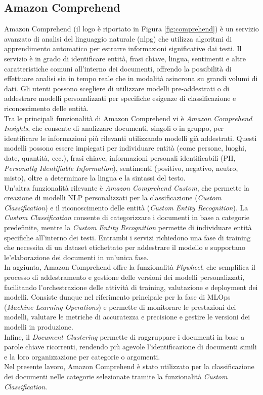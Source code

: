 \subsection{Amazon Comprehend}
Amazon Comprehend (il logo è riportato in Figura \ref{fig:comprehend}) è un servizio avanzato di analisi del linguaggio naturale (\gls{nlpg}) che utilizza algoritmi di apprendimento automatico per estrarre informazioni significative dai testi. Il servizio è in grado di identificare entità, frasi chiave, lingua, sentimenti e altre caratteristiche comuni all'interno dei documenti, offrendo la possibilità di effettuare analisi sia in tempo reale che in modalità asincrona su grandi volumi di dati. Gli utenti possono scegliere di utilizzare modelli pre-addestrati o di addestrare modelli personalizzati per specifiche esigenze di classificazione e riconoscimento delle entità.\\
Tra le principali funzionalità di Amazon Comprehend vi è \textit{Amazon Comprehend Insights}, che consente di analizzare documenti, singoli o in gruppo, per identificare le informazioni più rilevanti utilizzando modelli già addestrati. Questi modelli possono essere impiegati per individuare entità (come persone, luoghi, date, quantità, ecc.), frasi chiave, informazioni personali identificabili (PII, \textit{Personally Identifiable Information}), sentimenti (positivo, negativo, neutro, misto), oltre a determinare la lingua e la sintassi del testo.\\
Un'altra funzionalità rilevante è \textit{Amazon Comprehend Custom}, che permette la creazione di modelli NLP personalizzati per la classificazione (\textit{Custom Classification}) e il riconoscimento delle entità (\textit{Custom Entity Recognition}). La \textit{Custom Classification} consente di categorizzare i documenti in base a categorie predefinite, mentre la \textit{Custom Entity Recognition} permette di individuare entità specifiche all'interno dei testi. Entrambi i servizi richiedono una fase di training che necessita di un dataset etichettato per addestrare il modello e supportano le'elaborazione dei documenti in un'unica fase.\\
In aggiunta, Amazon Comprehend offre la funzionalità \textit{Flywheel}, che semplifica il processo di addestramento e gestione delle versioni dei modelli personalizzati, facilitando l'orchestrazione delle attività di training, valutazione e deployment dei modelli. Consiste dunque nel riferimento principale per la fase di MLOps (\textit{Machine Learning Operations}) e permette di monitorare le prestazioni dei modelli, valutare le metriche di accuratezza e precisione e gestire le versioni dei modelli in produzione.\\
Infine, il \textit{Document Clustering} permette di raggruppare i documenti in base a parole chiave ricorrenti, rendendo più agevole l'identificazione di documenti simili e la loro organizzazione per categorie o argomenti.\\
Nel presente lavoro, Amazon Comprehend è stato utilizzato per la classificazione dei documenti nelle categorie selezionate tramite la funzionalità \textit{Custom Classification}.

